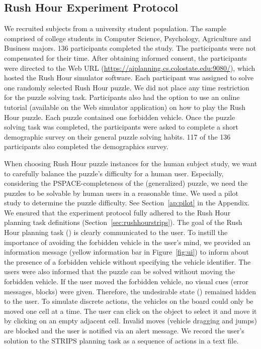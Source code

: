 \subsection{Rush Hour Experiment Protocol}
\label{sec:experimentprotocol1}
We recruited subjects from a university student population. 
The sample comprised of college students in Computer Science, Psychology, Agriculture and Business majors. 
136 participants completed  the study. 
The participants were not compensated for their time. 
After obtaining informed consent, the participants were directed to the Web URL (\url{https://aiplanning.cs.colostate.edu:9080/}), which hosted the Rush Hour simulator software. 
Each participant was assigned to solve one randomly selected Rush Hour puzzle. 
We did not place any time restriction for the puzzle solving task. Participants also had the option to use an online tutorial (available on the Web simulator application) on how to play the Rush Hour puzzle. 
Each puzzle contained one forbidden vehicle. 
Once the puzzle solving task was completed, the participants were asked to complete a short demographic survey on their general puzzle solving habits. 
117 of the 136 participants also completed the demographics survey. 

When choosing Rush Hour puzzle instances for the human subject study, we want to carefully balance the puzzle’s difficulty for a human user. 
Especially, considering the PSPACE-completeness of the (generalized)
puzzle, we need the puzzles to be solvable by human users in a reasonable time. 
We used a pilot study to determine the puzzle difficulty. 
See Section~\ref{ap:pilot} in the Appendix.
We ensured that the experiment protocol fully adhered to the Rush Hour planning task definitions (Section~\ref{sec:rushhourstrips}). 
The goal of the Rush Hour planning task (\desired) is clearly communicated to the user.
To instill the importance of avoiding the forbidden vehicle in the user’s mind, we provided an information message (yellow information bar in Figure~\ref{fig:ui}) to inform about the presence of a forbidden vehicle without specifying the vehicle identifier.
The users were also informed that the puzzle can be solved without moving the forbidden vehicle. 
If the user moved the forbidden vehicle, no visual cues (error messages, blocks) were given. 
Therefore, the undesirable state (\undesired) remained hidden to the user.
To simulate discrete actions, the vehicles on the board could only be moved one cell at a time. 
The user can click on the object to select it and move it by clicking on an empty adjacent cell. 
Invalid moves (vehicle dragging and jumps) are blocked and the user is notified via an alert message. 
We record the user's solution to the STRIPS planning task as a sequence of actions in a text file.

